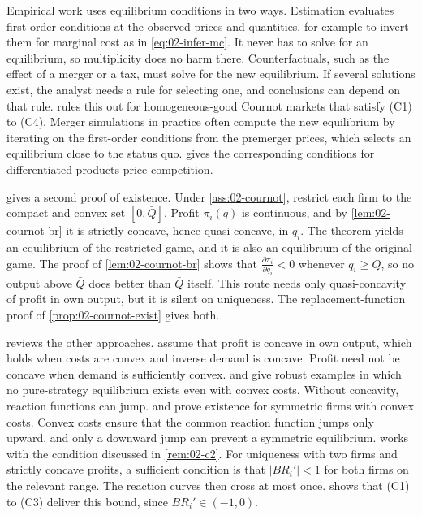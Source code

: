 \begin{remark}\label{rem:02-uniqueness}
Empirical work uses equilibrium conditions in two ways. Estimation evaluates first-order conditions at the observed
prices and quantities, for example to invert them for marginal cost as in \eqref{eq:02-infer-mc}. It never has to
solve for an equilibrium, so multiplicity does no harm there. Counterfactuals, such as the effect of a merger or a
tax, must solve for the new equilibrium. If several solutions exist, the analyst needs a rule for selecting one, and
conclusions can depend on that rule.  rules this out for homogeneous-good Cournot markets
that satisfy (C1) to (C4). Merger simulations in practice often compute the new equilibrium by iterating on the
first-order conditions from the premerger prices, which selects an equilibrium close to the status quo.
 gives the corresponding conditions for differentiated-products price competition.
\end{remark}

\begin{remark}\label{rem:02-cournot-routes}
 gives a second proof of existence. Under \cref{ass:02-cournot}, restrict each firm to the
compact and convex set $[0, \bar Q]$. Profit $\pi_i(q)$ is continuous, and by \cref{lem:02-cournot-br} it is strictly
concave, hence quasi-concave, in $q_i$. The theorem yields an equilibrium of the restricted game, and it is also an
equilibrium of the original game. The proof of \cref{lem:02-cournot-br} shows that $\frac{\partial \pi_i}{\partial
q_i} < 0$ whenever $q_i \ge \bar Q$, so no output above $\bar Q$ does better than $\bar Q$ itself. This route needs
only quasi-concavity of profit in own output, but it is silent on uniqueness. The replacement-function proof of
\cref{prop:02-cournot-exist} gives both.

\citet[sec.~5.7.1]{Tirole1988} reviews the other approaches. \citet{SzidarovszkyYakowitz1977} assume that profit is
concave in own output, which holds when costs are convex and inverse demand is concave. Profit need not be concave
when demand is sufficiently convex. \citet{Friedman1983} and \citet{RobertsSonnenschein1977} give robust examples in
which no pure-strategy equilibrium exists even with convex costs. Without concavity, reaction functions can jump.
\citet{McManus1964} and \citet{RobertsSonnenschein1976} prove existence for symmetric firms with convex costs.
Convex costs ensure that the common reaction function jumps only upward, and only a downward jump can prevent a
symmetric equilibrium. \citet{Novshek1985} works with the condition discussed in \cref{rem:02-c2}. For uniqueness
with two firms and strictly concave profits, a sufficient condition is that $\lvert BR_i'\rvert < 1$ for both firms on
the relevant range. The reaction curves then cross at most once.  shows that (C1) to (C3)
deliver this bound, since $BR_i' \in (-1, 0)$.
\end{remark}


